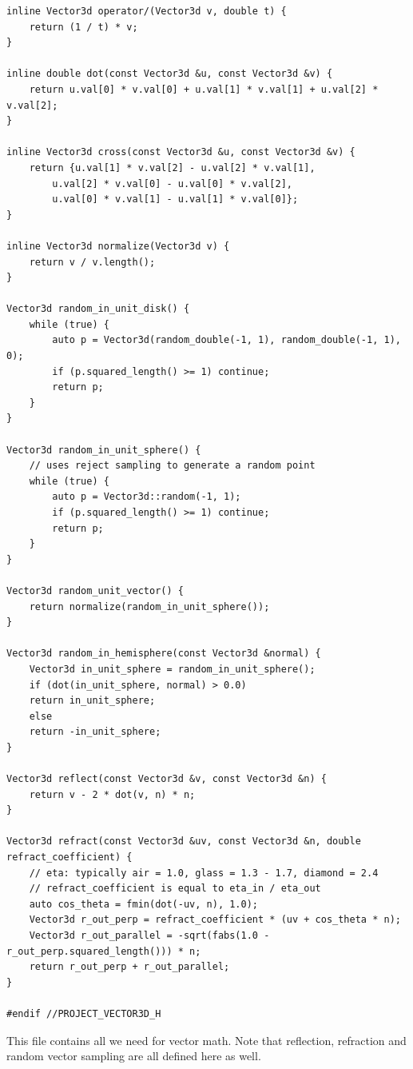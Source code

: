 \documentclass[utf8]{article}
\begin{document}
\begin{lstlisting}[style=CStyle]
inline Vector3d operator/(Vector3d v, double t) {
	return (1 / t) * v;
}

inline double dot(const Vector3d &u, const Vector3d &v) {
	return u.val[0] * v.val[0] + u.val[1] * v.val[1] + u.val[2] * v.val[2];
}

inline Vector3d cross(const Vector3d &u, const Vector3d &v) {
	return {u.val[1] * v.val[2] - u.val[2] * v.val[1],
		u.val[2] * v.val[0] - u.val[0] * v.val[2],
		u.val[0] * v.val[1] - u.val[1] * v.val[0]};
}

inline Vector3d normalize(Vector3d v) {
	return v / v.length();
}

Vector3d random_in_unit_disk() {
	while (true) {
		auto p = Vector3d(random_double(-1, 1), random_double(-1, 1), 0);
		if (p.squared_length() >= 1) continue;
		return p;
	}
}

Vector3d random_in_unit_sphere() {
	// uses reject sampling to generate a random point
	while (true) {
		auto p = Vector3d::random(-1, 1);
		if (p.squared_length() >= 1) continue;
		return p;
	}
}

Vector3d random_unit_vector() {
	return normalize(random_in_unit_sphere());
}

Vector3d random_in_hemisphere(const Vector3d &normal) {
	Vector3d in_unit_sphere = random_in_unit_sphere();
	if (dot(in_unit_sphere, normal) > 0.0)
	return in_unit_sphere;
	else
	return -in_unit_sphere;
}

Vector3d reflect(const Vector3d &v, const Vector3d &n) {
	return v - 2 * dot(v, n) * n;
}

Vector3d refract(const Vector3d &uv, const Vector3d &n, double refract_coefficient) {
	// eta: typically air = 1.0, glass = 1.3 - 1.7, diamond = 2.4
	// refract_coefficient is equal to eta_in / eta_out
	auto cos_theta = fmin(dot(-uv, n), 1.0);
	Vector3d r_out_perp = refract_coefficient * (uv + cos_theta * n);
	Vector3d r_out_parallel = -sqrt(fabs(1.0 - r_out_perp.squared_length())) * n;
	return r_out_perp + r_out_parallel;
}

#endif //PROJECT_VECTOR3D_H

\end{lstlisting}
This file contains all we need for vector math. Note that reflection, refraction and random vector sampling are all defined here as well.
\end{document}
